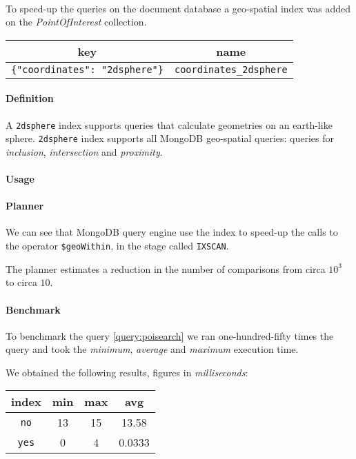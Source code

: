 \paragraph{}
To speed-up the queries on the document database a geo-spatial index was added
on the \textit{PointOfInterest} collection.

\begin{tabular}{|c|c|}
	\hline
	key & name \\
	\hline
	\texttt{\{"coordinates": "2dsphere"\}} & \texttt{coordinates\_2dsphere}
	\\
	\hline
\end{tabular}

\paragraph{Definition}
A \texttt{2dsphere} index supports queries that calculate geometries on an
earth-like sphere. \texttt{2dsphere} index supports all MongoDB geo-spatial
queries: queries for \textit{inclusion}, \textit{intersection} and
\textit{proximity}.

\paragraph{Usage}

\paragraph{Planner}
We can see that MongoDB query engine use the index to speed-up the calls to the
operator \texttt{\$geoWithin}, in the stage called \texttt{IXSCAN}.

The planner estimates a reduction in the number of comparisons from circa
$10^3$ to circa $10$.



\paragraph{Benchmark}
To benchmark the query \ref{query:poisearch} we ran one-hundred-fifty times the
query
and took the \textit{minimum}, \textit{average} and \textit{maximum} execution
time.



We obtained the following results, figures in \textit{milliseconds}:

\begin{tabular}{|c|c|c|c|}
	\hline
	index & min & max & avg \\
	\hline
	\hline
	\texttt{no} & 13 & 15 & 13.58 \\
	\hline
	\texttt{yes} & 0 & 4 & 0.0333 \\
	\hline
\end{tabular}


